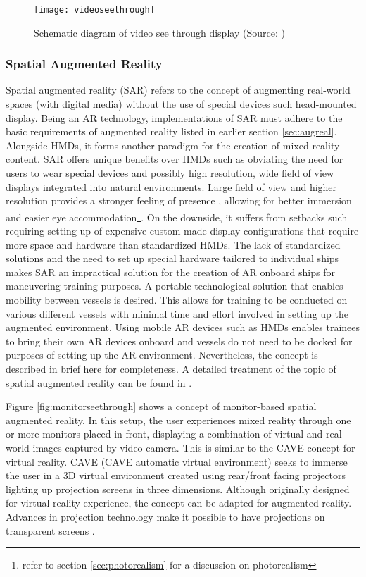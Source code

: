 \begin{figure}
	\centering
	\texttt{[image: videoseethrough]}
	\caption{Schematic diagram of video see through display (Source: \cite{azuma1997survey})}
	\label{fig:videoseethrough}
\end{figure}

\subsubsection{Spatial Augmented Reality}

Spatial augmented reality (SAR) refers to the concept of augmenting real-world spaces (with digital media) without the use of special devices such head-mounted display. Being an AR technology, implementations of SAR must adhere to the basic requirements of augmented reality listed in earlier section \ref{sec:augreal}. Alongside HMDs, it forms another paradigm for the creation of mixed reality content. SAR offers unique benefits over HMDs such as obviating the need for users to wear special devices and possibly high resolution, wide field of view displays integrated into natural environments. Large field of view and higher resolution provides a stronger feeling of presence \parencite{lantz1996future}, allowing for better immersion and easier eye accommodation\footnote{refer to section \ref{sec:photorealism} for a discussion on photorealism}. On the downside, it suffers from setbacks such requiring setting up of expensive custom-made display configurations that require more space and hardware than standardized HMDs.
The lack of standardized solutions and the need to set up special hardware tailored to individual ships makes SAR an impractical solution for the creation of AR onboard ships for maneuvering training purposes. A portable technological solution that enables mobility between vessels is desired. This allows for training to be conducted on various different vessels with minimal time and effort involved in setting up the augmented environment. Using mobile AR devices such as HMDs enables trainees to bring their own AR devices onboard and vessels do not need to be docked for purposes of setting up the AR environment. Nevertheless, the concept is described in brief here for completeness. A detailed treatment of the topic of spatial augmented reality can be found in \cite{bimber2005spatial}.

Figure \ref{fig:monitorseethrough} shows a concept of monitor-based spatial augmented reality. In this setup, the user experiences mixed reality through one or more monitors placed in front, displaying a combination of virtual and real-world images captured by video camera. This is similar to the CAVE \parencite{cruz1993surround} concept for virtual reality. CAVE (CAVE automatic virtual environment) seeks to immerse the user in a 3D virtual environment created using rear/front facing projectors lighting up projection screens in three dimensions. Although originally designed for virtual reality experience, the concept can be adapted for augmented reality. Advances in projection technology make it possible to have projections on transparent screens \parencite{peterson2006human}. 

